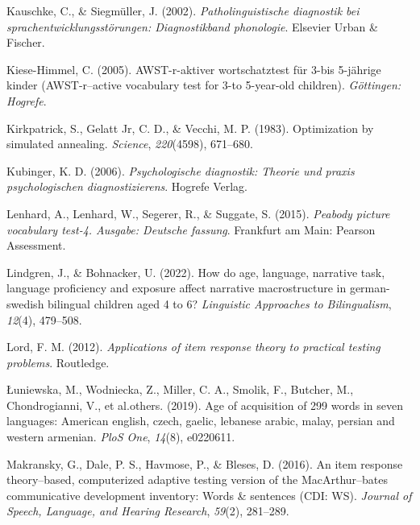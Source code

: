 \documentclass[
  man,floatsintext]{apa6}
\newlength{\cslhangindent}
\newlength{\cslentryspacingunit} %
\newenvironment{CSLReferences}[2] %
 {%
  \setlength{\parindent}{0pt}
  \ifodd #1
  \let\oldpar\par
  \def\par{\hangindent=\cslhangindent\oldpar}
  \fi
  \setlength{\parskip}{#2\cslentryspacingunit}
 }%
 {}
\begin{document}
\begin{CSLReferences}{1}{0}
\leavevmode{}%
Kauschke, C., \& Siegmüller, J. (2002). \emph{Patholinguistische diagnostik bei sprachentwicklungsst{ö}rungen: Diagnostikband phonologie}. Elsevier Urban \& Fischer.

\leavevmode{}%
Kiese-Himmel, C. (2005). AWST-r-aktiver wortschatztest f{ü}r 3-bis 5-j{ä}hrige kinder (AWST-r--active vocabulary test for 3-to 5-year-old children). \emph{G{ö}ttingen: Hogrefe}.

\leavevmode{}%
Kirkpatrick, S., Gelatt Jr, C. D., \& Vecchi, M. P. (1983). Optimization by simulated annealing. \emph{Science}, \emph{220}(4598), 671--680.

\leavevmode{}%
Kubinger, K. D. (2006). \emph{Psychologische diagnostik: Theorie und praxis psychologischen diagnostizierens}. Hogrefe Verlag.

\leavevmode{}%
Lenhard, A., Lenhard, W., Segerer, R., \& Suggate, S. (2015). \emph{Peabody picture vocabulary test-4. Ausgabe: Deutsche fassung}. Frankfurt am Main: Pearson Assessment.

\leavevmode{}%
Lindgren, J., \& Bohnacker, U. (2022). How do age, language, narrative task, language proficiency and exposure affect narrative macrostructure in german-swedish bilingual children aged 4 to 6? \emph{Linguistic Approaches to Bilingualism}, \emph{12}(4), 479--508.

\leavevmode{}%
Lord, F. M. (2012). \emph{Applications of item response theory to practical testing problems}. Routledge.

\leavevmode{}%
Łuniewska, M., Wodniecka, Z., Miller, C. A., Smolik, F., Butcher, M., Chondrogianni, V., et al.others. (2019). Age of acquisition of 299 words in seven languages: American english, czech, gaelic, lebanese arabic, malay, persian and western armenian. \emph{PloS One}, \emph{14}(8), e0220611.

\leavevmode{}%
Makransky, G., Dale, P. S., Havmose, P., \& Bleses, D. (2016). An item response theory--based, computerized adaptive testing version of the MacArthur--bates communicative development inventory: Words \& sentences (CDI: WS). \emph{Journal of Speech, Language, and Hearing Research}, \emph{59}(2), 281--289.


\end{CSLReferences}
\end{document}

